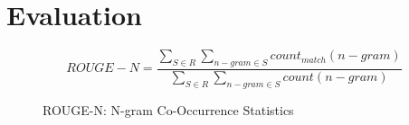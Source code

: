 \section{Evaluation}\label{sec:evaluation}

\begin{figure}[h]
    \centering
    \begin{equation}
        ROUGE-N = \frac{\sum_{S \in R} \sum_{n-gram \in S} count_{match}(n-gram)}{\sum_{S \in R} \sum_{n-gram \in S} count(n-gram)}\label{eq:equation}
    \end{equation}
    \caption{ROUGE-N: N-gram Co-Occurrence Statistics}
    \label{fig:rouge_formula}
\end{figure}
